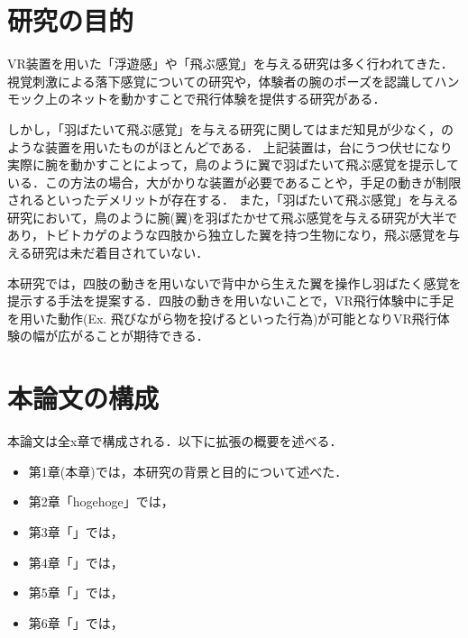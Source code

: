 \section{研究の目的}

        VR装置を用いた「浮遊感」や「飛ぶ感覚」を与える研究は多く行われてきた．視覚刺激による落下感覚についての研究\cite{奥川夏輝2017VR空間における視覚刺激によって発生する落下感覚の分析}や，体験者の腕のポーズを認識してハンモック上のネットを動かすことで飛行体験を提供する研究\cite{鈴木拓馬2014hmd}がある．


        しかし，「羽ばたいて飛ぶ感覚」を与える研究に関してはまだ知見が少なく，のような装置を用いたものがほとんどである\cite{rheiner2014birdly}\cite{hypersuit}．
        上記装置は，台にうつ伏せになり実際に腕を動かすことによって，鳥のように翼で羽ばたいて飛ぶ感覚を提示している．この方法の場合，大がかりな装置が必要であることや，手足の動きが制限されるといったデメリットが存在する．
        また，「羽ばたいて飛ぶ感覚」を与える研究において，鳥のように腕(翼)を羽ばたかせて飛ぶ感覚を与える研究が大半であり，トビトカゲのような四肢から独立した翼を持つ生物になり，飛ぶ感覚を与える研究は未だ着目されていない．

        本研究では，四肢の動きを用いないで背中から生えた翼を操作し羽ばたく感覚を提示する手法を提案する．四肢の動きを用いないことで，VR飛行体験中に手足を用いた動作(Ex. 飛びながら物を投げるといった行為)が可能となりVR飛行体験の幅が広がることが期待できる．


\section{本論文の構成}

        本論文は全x章で構成される．以下に拡張の概要を述べる．

        \begin{itemize}
                \item 第1章(本章)では，本研究の背景と目的について述べた．
                \item 第2章「hogehoge」では，
                \item 第3章「」では，
                \item 第4章「」では，
                \item 第5章「」では，
                \item 第6章「」では，
        \end{itemize}
        


        
